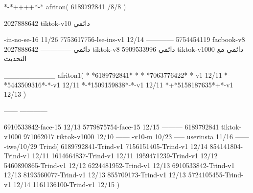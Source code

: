 *-*++++*-*
afriton(
6189792841 /8/8
)

2027888642 tiktok-v10
دائمي

-in-no-se-16 11/26
7753617756-lse-ins-v1 12/14
------------
5754454119 facbook-v8
دائمي
--------------
2027888642 tiktok-v8
دائمي
5909533996 tiktok-v1000
دائمي مع التحديث

__________
afriton1(
*-*6189792841*-*
*-*7063776422*-*-v1 12/11
*-*5443509316*-*-v1 12/11
*-*1509159838*-*-v1 12/11
*+*5158187635*+*-v1 12/13
)

------
------------


6910533842-face-15 12/13
5779875754-face-15 12/15
---------
6189792841 tiktok-v1000
971062017 tiktok-v1000 12/10
------
-v10-m 10/23
-----
userinsta 11/16
------
-twe/10/29
Trind(
6189792841-Trind-v1 
7156151405-Trind-v1 12/14
854141804-Trind-v1 12/11
1614664837-Trind-v1 12/11
1959471239-Trind-v1 12/12
5460890865-Trind-v1 12/12
6224481952-Trind-v1 12/13
6910533842-Trind-v1 12/13
8193560077-Trind-v1 12/13
855709173-Trind-v1 12/13
5724105455-Trind-v1 12/14
1161136100-Trind-v1 12/15
)
